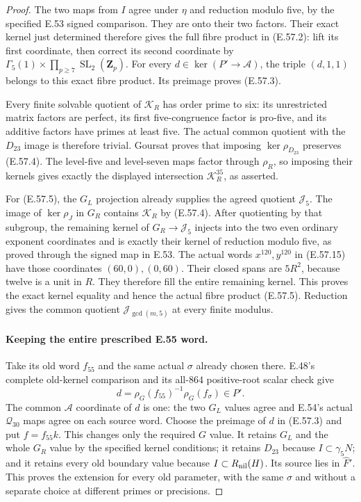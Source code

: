 \begin{proof}
The two maps from $I$ agree under $\eta$ and
reduction modulo five, by the specified E.53
signed comparison.  They are onto their two
factors.  Their exact kernel just determined
therefore gives the full fibre product in
\textup{(E.57.2)}: lift its first coordinate,
then correct its second coordinate by
$\Gamma_5(1)\times\prod_{p\ge7}\operatorname{SL}_2(\mathbf Z_p)$.
For every $d\in\ker(P'\to\mathcal A)$, the
triple $(d,1,1)$ belongs to this exact fibre
product.  Its preimage proves
\textup{(E.57.3)}.

Every finite solvable quotient of $\mathcal K_R$
has order prime to six: its unrestricted matrix
factors are perfect, its first five-congruence
factor is pro-five, and its additive factors
have primes at least five.  The actual common
quotient with the $D_{23}$ image is therefore
trivial.  Goursat proves that imposing
$\ker\rho_{D_{23}}$ preserves
\textup{(E.57.4)}.  The level-five and level-seven
maps factor through $\rho_R$, so imposing their
kernels gives exactly the displayed intersection
$\mathcal K_R^{35}$, as asserted.

For \textup{(E.57.5)}, the $G_L$ projection
already supplies the agreed quotient
$\mathcal J_5$.  The image of $\ker\rho_J$ in
$G_R$ contains $\mathcal K_R$ by
\textup{(E.57.4)}.  After quotienting by that
subgroup, the remaining kernel of
$G_R\to\mathcal J_5$ injects into the two
even ordinary exponent coordinates and is
exactly their kernel of reduction modulo five,
as proved through the signed map in E.53.
The actual words $x^{120},y^{120}$ in
\textup{(E.57.15)} have those coordinates
$(60,0),(0,60)$.  Their closed spans are
$5R^2$, because twelve is a unit in $R$.
They therefore fill the entire remaining
kernel.  This proves the exact kernel equality
and hence the actual fibre product
\textup{(E.57.5)}.  Reduction gives the common
quotient $\mathcal J_{\gcd(m,5)}$ at every
finite modulus.

\paragraph{Keeping the entire prescribed E.55 word.}
Take its old word $f_{55}$ and the same actual
$\sigma$ already chosen there.  E.48's complete
old-kernel comparison and its all-$864$ positive-root
scalar check give
\[
              d=\rho_G(f_{55})^{-1}\rho_G(f_\sigma)\in P'.
 \tag{E.57.18}
\]
The common $\mathcal A$ coordinate of $d$ is one:
the two $G_L$ values agree and E.54's actual
$\mathcal Q_{30}$ maps agree on each source word.
Choose the preimage of $d$ in
\textup{(E.57.3)} and put $f=f_{55}k$.
This changes only the required $G$ value.
It retains $G_L$ and the whole $G_R$ value
by the specified kernel conditions; it retains
$D_{23}$ because $I\subset\gamma_5N$; and
it retains every old boundary value because
$I\subset R_{\rm nil}(H)$.  Its source lies
in $\widehat F'$.  This proves the extension
for every old parameter, with the same $\sigma$
and without a separate choice at different
primes or precisions.


\end{proof}
